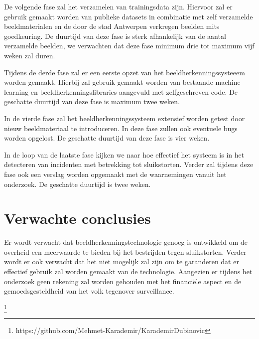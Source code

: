 \documentclass{hogent-article}
\begin{document}
De volgende fase zal het verzamelen van trainingsdata zijn. Hiervoor zal er gebruik gemaakt worden van publieke datasets in combinatie met zelf verzamelde beeldmaterialen en de door de stad Antwerpen verkregen beelden mits goedkeuring. De duurtijd van deze fase is sterk afhankelijk van de aantal verzamelde beelden, we verwachten dat deze fase minimum drie tot maximum vijf weken zal duren.

Tijdens de derde fase zal er een eerste opzet van het beeldherkenningssysteeem worden gemaakt. Hierbij zal gebruik gemaakt worden van bestaande machine learning en beeldherkenningslibraries aangevuld met zelfgeschreven code. De geschatte duurtijd van deze fase is maximum twee weken. 

In de vierde fase zal het beeldherkenningssysteem extensief worden getest door nieuw beeldmateriaal te introduceren. In deze fase zullen ook eventuele bugs worden opgelost. De geschatte duurtijd van deze fase is vier weken.

In de loop van de laatste fase kijken we naar hoe effectief het systeem is in het detecteren van incidenten met betrekking tot sluikstorten. Verder zal tijdens deze fase ook een verslag worden opgemaakt met de waarnemingen vanuit het onderzoek. De geschatte duurtijd is twee weken.

\section{Verwachte conclusies}


Er wordt verwacht dat beeldherkenningstechnologie genoeg is ontwikkeld om de overheid een meerwaarde te bieden bij het bestrijden tegen sluikstorten. Verder wordt er ook verwacht dat het niet mogelijk zal zijn om te garanderen dat er effectief gebruik zal worden gemaakt van de technologie. Aangezien er tijdens het onderzoek geen rekening zal worden gehouden met het financiële aspect en de gemoedsgesteldheid van het volk tegenover surveillance.


\printbibliography[heading=bibintoc]
\footnote{https://github.com/Mehmet-Karademir/KarademirDubinovic}
\end{document}
